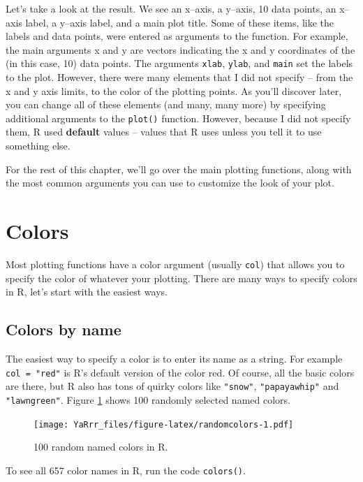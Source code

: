 \documentclass[]{book}
\theoremstyle{definition}
\theoremstyle{definition}
\theoremstyle{remark}
\begin{document}
Let's take a look at the result. We see an x--axis, a y--axis, 10 data
points, an x--axis label, a y--axis label, and a main plot title. Some
of these items, like the labels and data points, were entered as
arguments to the function. For example, the main arguments x and y are
vectors indicating the x and y coordinates of the (in this case, 10)
data points. The arguments \texttt{xlab}, \texttt{ylab}, and
\texttt{main} set the labels to the plot. However, there were many
elements that I did not specify -- from the x and y axis limits, to the
color of the plotting points. As you'll discover later, you can change
all of these elements (and many, many more) by specifying additional
arguments to the \texttt{plot()} function. However, because I did not
specify them, R used \textbf{default} values -- values that R uses
unless you tell it to use something else.

For the rest of this chapter, we'll go over the main plotting functions,
along with the most common arguments you can use to customize the look
of your plot.

\section{Colors}\label{colors}

Most plotting functions have a color argument (usually \texttt{col})
that allows you to specify the color of whatever your plotting. There
are many ways to specify colors in R, let's start with the easiest ways.

\subsection{Colors by name}\label{colors-by-name}

The easiest way to specify a color is to enter its name as a string. For
example \texttt{col\ =\ "red"} is R's default version of the color red.
Of course, all the basic colors are there, but R also has tons of quirky
colors like \texttt{"snow"}, \texttt{"papayawhip"} and
\texttt{"lawngreen"}. Figure \ref{fig:randomcolors} shows 100 randomly
selected named colors.

\begin{figure}[htbp]
\centering
\texttt{[image: YaRrr\_files/figure-latex/randomcolors-1.pdf]}
\caption{\label{fig:randomcolors}100 random named colors in R.}
\end{figure}

To see all 657 color names in R, run the code \texttt{colors()}.
\end{document}
